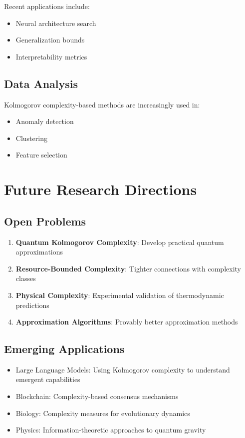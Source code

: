 \documentclass[12pt,a4paper]{report}
\begin{document}
Recent applications include:
\begin{itemize}
    \item Neural architecture search \cite{martin2021implicit}
    \item Generalization bounds \cite{suzuki2020compression}
    \item Interpretability metrics \cite{arora2022theory}
\end{itemize}

\subsection{Data Analysis}

Kolmogorov complexity-based methods are increasingly used in:
\begin{itemize}
    \item Anomaly detection \cite{wang2023anomaly}
    \item Clustering \cite{vitanyi2022similarity}
    \item Feature selection \cite{zhang2024MDL}
\end{itemize}

\section{Future Research Directions}

\subsection{Open Problems}

\begin{enumerate}
    \item \textbf{Quantum Kolmogorov Complexity}: Develop practical quantum approximations
    \item \textbf{Resource-Bounded Complexity}: Tighter connections with complexity classes
    \item \textbf{Physical Complexity}: Experimental validation of thermodynamic predictions
    \item \textbf{Approximation Algorithms}: Provably better approximation methods
\end{enumerate}

\subsection{Emerging Applications}

\begin{itemize}
    \item Large Language Models: Using Kolmogorov complexity to understand emergent capabilities
    \item Blockchain: Complexity-based consensus mechanisms
    \item Biology: Complexity measures for evolutionary dynamics
    \item Physics: Information-theoretic approaches to quantum gravity
\end{itemize}
\end{document}
